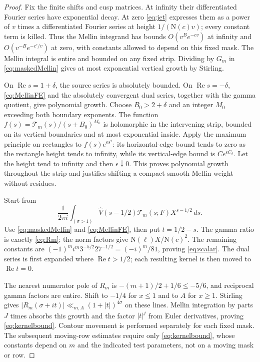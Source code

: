 \documentclass[11pt,a4paper]{article}
\numberwithin{equation}{section}
\theoremstyle{definition}
\theoremstyle{remark}
\newcommand{\N}{\mathrm N}
\newcommand{\dd}{\,d}
\newcommand{\Rea}{\operatorname{Re}}
\newcommand{\wt}{\widehat}
\begin{document}
\begin{proof}
Fix the finite shifts and cusp matrices. At infinity their differentiated Fourier series have exponential decay. At zero \eqref{eq:jet} expresses them as a power of $v$ times a differentiated Fourier series at height $1/(\N(c)v)$; every constant term is killed. Thus the Mellin integrand has bounds $O(v^Be^{-cv})$ at infinity and $O(v^{-B}e^{-c'/v})$ at zero, with constants allowed to depend on this fixed mask. The Mellin integral is entire and bounded on any fixed strip. Dividing by $G_m$ in \eqref{eq:maskedMellin} gives at most exponential vertical growth by Stirling.

On $\Rea s=1+\delta$, the source series is absolutely bounded. On $\Rea s=-\delta$, \eqref{eq:MellinFE} and the absolutely convergent dual series, together with the gamma quotient, give polynomial growth. Choose $B_0>2+\delta$ and an integer $M_0$ exceeding both boundary exponents. The function $f(s)=\mathcal T_m(s)/(s+B_0)^{M_0}$ is holomorphic in the intervening strip, bounded on its vertical boundaries and at most exponential inside. Apply the maximum principle on rectangles to $f(s)e^{\epsilon s^2}$: its horizontal-edge bound tends to zero as the rectangle height tends to infinity, while its vertical-edge bound is $C e^{\epsilon C_\delta}$. Let the height tend to infinity and then $\epsilon\downarrow0$. This proves polynomial growth throughout the strip and justifies shifting a compact smooth Mellin weight without residues.

Start from
\[
 \frac1{2\pi i}\int_{(\sigma>1)}\wt V(s-1/2)\mathcal T_m(s;F)X^{s-1/2}\dd s.
\]
Use \eqref{eq:maskedMellin} and \eqref{eq:MellinFE}, then put $t=1/2-s$. The gamma ratio is exactly \eqref{eq:Rm}; the norm factors give $\N(\ell)X/\N(c)^2$. The remaining constants are
$(-1)^mi^m3^{-5/2}27^{-1/2}=(-i)^m/81$, proving \eqref{eq:scalar}. The dual series is first expanded where $\Rea t>1/2$; each resulting kernel is then moved to $\Rea t=0$.

The nearest numerator pole of $R_m$ is $-(m+1)/2+1/6\le-5/6$, and reciprocal gamma factors are entire. Shift to $-1/4$ for $x\le1$ and to $A$ for $x\ge1$. Stirling gives $|R_m(\sigma+it)|\ll_{m,A}(1+|t|)^{4\sigma}$ on these lines. Mellin integration by parts $J$ times absorbs this growth and the factor $|t|^j$ from Euler derivatives, proving \eqref{eq:kernelbound}. Contour movement is performed separately for each fixed mask. The subsequent moving-row estimates require only \eqref{eq:kernelbound}, whose constants depend on $m$ and the indicated test parameters, not on a moving mask or row.
\end{proof}
\end{document}
